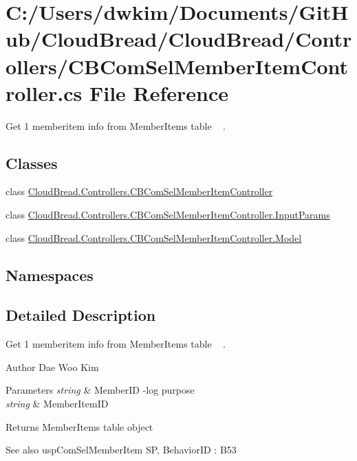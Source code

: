 \hypertarget{a00205}{}\section{C\+:/\+Users/dwkim/\+Documents/\+Git\+Hub/\+Cloud\+Bread/\+Cloud\+Bread/\+Controllers/\+C\+B\+Com\+Sel\+Member\+Item\+Controller.cs File Reference}
\label{a00205}


Get 1 memberitem info from Member\+Items table ~\newline
.  


\subsection*{Classes}
\begin{DoxyCompactItemize}
\item 
class \hyperlink{a00032}{Cloud\+Bread.\+Controllers.\+C\+B\+Com\+Sel\+Member\+Item\+Controller}
\item 
class \hyperlink{a00121}{Cloud\+Bread.\+Controllers.\+C\+B\+Com\+Sel\+Member\+Item\+Controller.\+Input\+Params}
\item 
class \hyperlink{a00159}{Cloud\+Bread.\+Controllers.\+C\+B\+Com\+Sel\+Member\+Item\+Controller.\+Model}
\end{DoxyCompactItemize}
\subsection*{Namespaces}
\begin{DoxyCompactItemize}
\end{DoxyCompactItemize}


\subsection{Detailed Description}
Get 1 memberitem info from Member\+Items table ~\newline
. 

\begin{DoxyAuthor}{Author}
Dae Woo Kim 
\end{DoxyAuthor}

\begin{DoxyParams}{Parameters}
{\em string} & Member\+ID -\/log purpose \\
\hline
{\em string} & Member\+Item\+ID \\
\hline
\end{DoxyParams}
\begin{DoxyReturn}{Returns}
Member\+Items table object 
\end{DoxyReturn}
\begin{DoxySeeAlso}{See also}
usp\+Com\+Sel\+Member\+Item SP, Behavior\+ID \+: B53 
\end{DoxySeeAlso}
